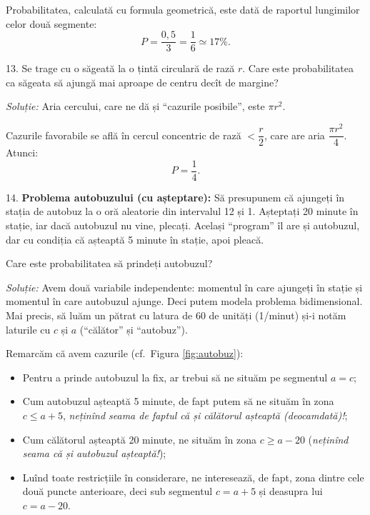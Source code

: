 \documentclass[12pt,a4paper]{article}
\newcommand\qq{\enquote}
\theoremstyle{dotless}
\theoremstyle{dotlessdr}
\begin{document}
Probabilitatea, calculată cu formula geometrică, este dată de raportul lungimilor
celor două segmente:
\[
  P = \frac{0,5}{3} = \frac{1}{6} \simeq 17\%.
\]

\vspace{1cm}

13. Se trage cu o săgeată la o țintă circulară de rază $ r $. Care este probabilitatea
ca săgeata să ajungă mai aproape de centru decît de margine?

\emph{Soluție:} Aria cercului, care ne dă și \qq{cazurile posibile}, este $ \pi r^2 $.

Cazurile favorabile se află în cercul concentric de rază $ < \dfrac{r}{2} $, care are
aria $ \dfrac{\pi r^2}{4} $. Atunci:
\[
  P = \frac{1}{4}.
\]

\vspace{1cm}

14. \textbf{Problema autobuzului (cu așteptare):} Să presupunem că ajungeți în stația
de autobuz la o oră aleatorie din intervalul 12 și 1. Așteptați 20 minute în stație,
iar dacă autobuzul nu vine, plecați. Același \qq{program} îl are și autobuzul, dar
cu condiția că așteaptă 5 minute în stație, apoi pleacă.

Care este probabilitatea să prindeți autobuzul?\footnotemark


\emph{Soluție:} Avem două variabile independente: momentul în care ajungeți în stație
și momentul în care autobuzul ajunge. Deci putem modela problema bidimensional. Mai precis,
să luăm un pătrat cu latura de 60 de unități (1/minut) și-i notăm laturile cu $ c $ și $ a $
(\qq{călător} și \qq{autobuz}).

Remarcăm că avem cazurile (cf.\ Figura \ref{fig:autobuz}):
\begin{itemize}
\item Pentru a prinde autobuzul la fix, ar trebui să ne situăm pe segmentul $ a = c $;
\item Cum autobuzul așteaptă 5 minute, de fapt putem să ne situăm în zona $ c \leq a + 5 $,
  \emph{neținînd seama de faptul că și călătorul așteaptă (deocamdată)!};
\item Cum călătorul așteaptă 20 minute, ne situăm în zona $ c \geq a - 20 $ (\emph{neținînd %
  seama că și autobuzul așteaptă!});
\item Luînd toate restricțiile în considerare, ne interesează, de fapt, zona dintre cele
  două puncte anterioare, deci sub segmentul $ c = a + 5 $ și deasupra lui $ c = a - 20 $.
\end{itemize}
\end{document}
